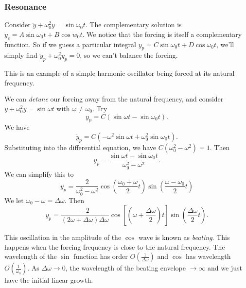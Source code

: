 \documentclass[a4paper]{article}
\begin{document}
\subsubsection{Resonance}
Consider $\ddot y + \omega_0^2 y = \sin \omega_0 t$. The complementary solution is $y_c = A\sin \omega_0 t + B\cos w_0 t$. We notice that the forcing is itself a complementary function. So if we guess a particular integral $y_p = C\sin \omega_0 t + D\cos \omega_0 t$, we'll simply find $\ddot y_p + \omega_0 ^2 y_p = 0$, so we can't balance the forcing.

This is an example of a simple harmonic oscillator being forced at its natural frequency.

We can \emph{detune} our forcing away from the natural frequency, and consider $\ddot y + \omega_0^2 y = \sin \omega t$ with $\omega \not= \omega_0$. Try
\[
  y_p = C(\sin \omega t - \sin \omega_0 t).
\]
We have
\[
  \ddot y_p = C(-\omega^2 \sin \omega t + \omega_0^2 \sin\omega_0 t).
\]
Substituting into the differential equation, we have $C(\omega_0^2 - \omega^2) = 1$. Then
\[
  y_p = \frac{\sin \omega t - \sin \omega_0t}{\omega_0^2 - \omega^2}.
\]
We can simplify this to
\[
  y_p = \frac{2}{\omega_0^2 - \omega^2} \cos \left(\frac{\omega_0 + \omega}{2}t\right) \sin \left(\frac{\omega - \omega_0}{2} t\right)
\]
We let $\omega_0 - \omega = \Delta \omega$. Then
\[
  y_p = \frac{-2}{(2\omega + \Delta \omega)\Delta \omega}\cos \left[\left(\omega + \frac{\Delta \omega}{2}\right)t\right] \sin \left(\frac{\Delta \omega}{2}t\right).
\]
\begin{center}
\end{center}
This oscillation in the amplitude of the $\cos$ wave is known as \emph{beating}. This happens when the forcing frequency is close to the natural frequency. The wavelength of the $\sin$ function has order $O(\frac{1}{\Delta \omega})$ and $\cos$ has wavelength $O(\frac{1}{\omega_0})$. As $\Delta\omega\to 0$, the wavelength of the beating envelope $\to \infty$ and we just have the initial linear growth.
\end{document}
